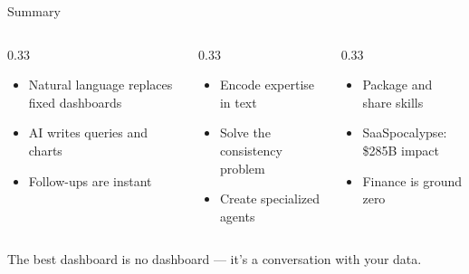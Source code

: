 \documentclass[aspectratio=169]{beamer}
\begin{document}
\begin{frame}{Summary}
\begin{columns}[T]
\begin{column}{0.33\textwidth}
\begin{shadedbox}[title=\textbf{Dashboards}]
\begin{itemize}\small
  \item Natural language replaces fixed dashboards
  \item AI writes queries and charts
  \item Follow-ups are instant
\end{itemize}
\end{shadedbox}
\end{column}
\begin{column}{0.33\textwidth}
\begin{shadedbox}[title=\textbf{Skills}]
\begin{itemize}\small
  \item Encode expertise in text
  \item Solve the consistency problem
  \item Create specialized agents
\end{itemize}
\end{shadedbox}
\end{column}
\begin{column}{0.33\textwidth}
\begin{shadedbox}[title=\textbf{Plugins}]
\begin{itemize}\small
  \item Package and share skills
  \item SaaSpocalypse: \$285B impact
  \item Finance is ground zero
\end{itemize}
\end{shadedbox}
\end{column}
\end{columns}
\vspace{0.5cm}
\begin{center}
\alert{The best dashboard is no dashboard --- it's a conversation with your data.}
\end{center}
\end{frame}
\end{document}
